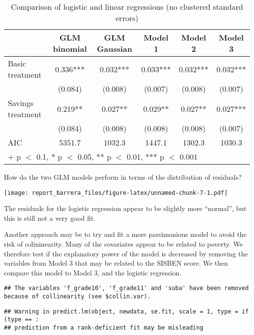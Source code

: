 \documentclass[
]{article}
\begin{document}
\begin{table}

\caption{\label{tab:unnamed-chunk-6}Comparison of logistic and linear regressions (no clustered standard errors)}
\centering
\begin{tabular}[t]{lccccc}
\toprule
  & GLM binomial & GLM Gaussian & Model 1 & Model 2 & Model 3\\
\midrule
Basic treatment & \num{0.336}*** & \num{0.032}*** & \num{0.033}*** & \num{0.032}*** & \num{0.032}***\\
 & (\num{0.084}) & (\num{0.008}) & (\num{0.007}) & (\num{0.008}) & (\num{0.007})\\
Savings treatment & \num{0.219}** & \num{0.027}** & \num{0.029}** & \num{0.027}** & \num{0.027}***\\
 & (\num{0.084}) & (\num{0.008}) & (\num{0.008}) & (\num{0.008}) & (\num{0.007})\\
\midrule
AIC & \num{5351.7} & \num{1032.3} & \num{1447.1} & \num{1302.3} & \num{1030.3}\\
\bottomrule
\multicolumn{6}{l}{\rule{0pt}{1em}+ p $<$ 0.1, * p $<$ 0.05, ** p $<$ 0.01, *** p $<$ 0.001}\\
\end{tabular}
\end{table}

How do the two GLM models perform in terms of the distribution of
residuals?

\texttt{[image: report\_barrera\_files/figure-latex/unnamed-chunk-7-1.pdf]}

The residuals for the logistic regression appear to be slightly more
``normal'', but this is still not a very good fit.

Another approach may be to try and fit a more parsimonious model to
avoid the risk of colininearity. Many of the covariates appear to be
related to poverty. We therefore test if the explanatory power of the
model is decreased by removing the variables from Model 3 that may be
related to the SISBEN score. We then compare this model to Model 3, and
the logistic regression.

\begin{verbatim}
## The variables 'f_grade10', 'f_grade11' and 'suba' have been removed because of collinearity (see $collin.var).
\end{verbatim}

\begin{verbatim}
## Warning in predict.lm(object, newdata, se.fit, scale = 1, type = if (type == :
## prediction from a rank-deficient fit may be misleading
\end{verbatim}
\end{document}
